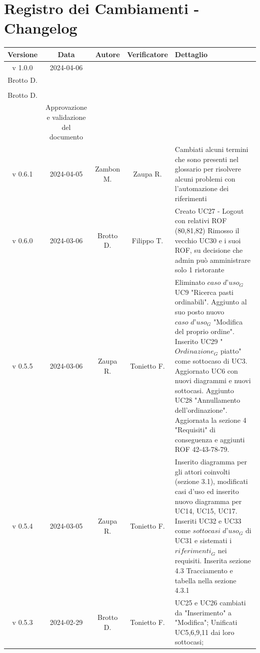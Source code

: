 \documentclass[12pt, oneside]{article}
\begin{document}
\section*{Registro dei Cambiamenti - Changelog}
\begin{longtable}{|c|c|c|c|p{7cm}|}
\hline
\textbf{Versione} & \textbf{Data} & \textbf{Autore} & \textbf{Verificatore} & 
\textbf{Dettaglio} \\
\hline
v 1.0.0 & 2024-04-06 &   \begin{tabular}[c]{@{}c@{}}
    Zaupa R. \\
    Brotto D. \\
  \end{tabular}  & \begin{tabular}[c]{@{}c@{}}
    Zaupa R. \\
    Brotto D. \\
  \end{tabular} & Approvazione e validazione del documento\\
\hline
v 0.6.1 & 2024-04-05 & Zambon M. & Zaupa R. & Cambiati alcuni termini che sono presenti nel glossario per risolvere alcuni problemi con l’automazione dei riferimenti\\
\hline
v 0.6.0 & 2024-03-06 & Brotto D. & Filippo T. & Creato UC27 - Logout con relativi ROF (80,81,82) 
\newline Rimosso il vecchio UC30 e i suoi ROF, su decisione che admin può amministrare solo 1 ristorante
\\
\hline
v 0.5.5 & 2024-03-06 & Zaupa R. & Tonietto F. & Eliminato $\textit{caso d'uso}_G$ UC9 "Ricerca pasti ordinabili". Aggiunto al suo posto nuovo $\textit{caso d'uso}_G$ "Modifica del proprio ordine". Inserito UC29 "$\textit{Ordinazione}_G$ piatto" come sottocaso di UC3. Aggiornato UC6 con nuovi diagrammi e nuovi sottocasi. Aggiunto UC28 "Annullamento dell'ordinazione". Aggiornata la sezione 4 "Requisiti" di conseguenza e aggiunti ROF 42-43-78-79. \\
\hline
v 0.5.4 & 2024-03-05 & Zaupa R. & Tonietto F. & Inserito diagramma per gli attori coinvolti (sezione 3.1), modificati casi d'uso ed inserito nuovo diagramma per UC14, UC15, UC17. Inseriti UC32 e UC33 come $\textit{sottocasi d'uso}_G$ di UC31 e sistemati i $\textit{riferimenti}_G$ nei requisiti. Inserita sezione 4.3 Tracciamento e tabella nella sezione 4.3.1\\
\hline
v 0.5.3 & 2024-02-29 & Brotto D. & Tonietto F. & UC25 e UC26 cambiati da "Inserimento" a "Modifica";
\newline Unificati UC5,6,9,11 dai loro sottocasi;

\end{longtable}
\end{document}
